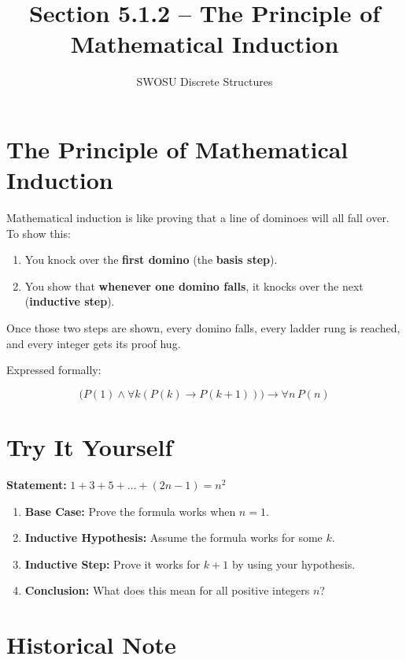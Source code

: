 \documentclass[12pt]{article}
\title{Section 5.1.2 – The Principle of Mathematical Induction}
\author{SWOSU Discrete Structures}
\date{}
\begin{document}
\maketitle

\section*{The Principle of Mathematical Induction}

Mathematical induction is like proving that a line of dominoes will all fall over.  
To show this:
\begin{enumerate}
    \item You knock over the \textbf{first domino} (the \textbf{basis step}).
    \item You show that \textbf{whenever one domino falls}, it knocks over the next (\textbf{inductive step}).
\end{enumerate}

\noindent Once those two steps are shown, every domino falls, every ladder rung is reached, and every integer gets its proof hug.  

\vspace{1em}
\noindent Expressed formally:

\[
\big( P(1) \wedge \forall k (P(k) \rightarrow P(k+1)) \big) \rightarrow \forall n\, P(n)
\]

\section*{Try It Yourself}

\textbf{Statement:} $1 + 3 + 5 + \dots + (2n - 1) = n^2$

\begin{enumerate}[label=\alph*)]
    \item \textbf{Base Case:} Prove the formula works when $n=1$.  
    \vspace{1em}
    \item \textbf{Inductive Hypothesis:} Assume the formula works for some $k$.  
    \vspace{1em}
    \item \textbf{Inductive Step:} Prove it works for $k+1$ by using your hypothesis.  
    \vspace{1em}
    \item \textbf{Conclusion:} What does this mean for all positive integers $n$?
\end{enumerate}

\section*{Historical Note}
\end{document}
